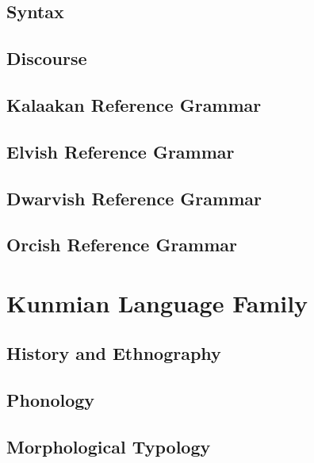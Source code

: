 \documentclass[12pt,letterpaper,openany,twoside]{memoir}
\let\originalpart=\part
\def\part{\cleardoublepage\originalpart}
\begin{document}
\chapter{Syntax}

\chapter{Discourse}

\chapter{Kalaakan Reference Grammar}

\chapter{Elvish Reference Grammar}

\chapter{Dwarvish Reference Grammar}

\chapter{Orcish Reference Grammar}

\part{Kunmian Language Family}

\chapter{History and Ethnography}

\chapter{Phonology}

\chapter{Morphological Typology}
\end{document}
